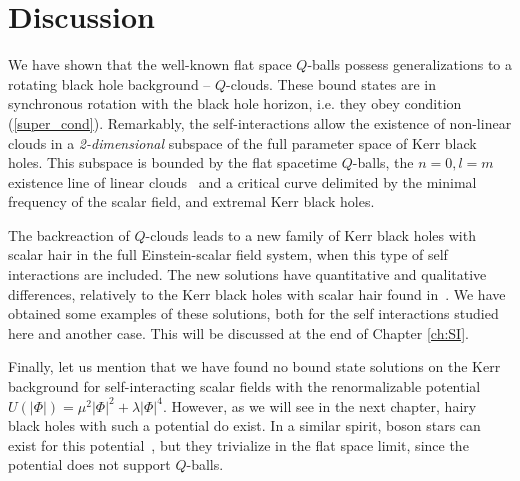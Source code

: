  
 
\section{Discussion} 

We have shown that
the well-known flat space $Q$-balls 
possess generalizations to a rotating black hole background -- $Q$-clouds. These bound states are 
in synchronous rotation with the black hole horizon, i.e. they obey condition (\ref{super_cond}).
Remarkably,
the self-interactions allow the existence of non-linear clouds 
in a \textit{2-dimensional} subspace of the full parameter space of Kerr black holes.
%
This subspace is bounded by the flat spacetime $Q$-balls,
the  $n=0,l=m$ existence line of linear clouds~\cite{Benone:2014ssa}
and a critical curve delimited by the minimal frequency of the scalar field,
and extremal Kerr black holes.
 
The backreaction of $Q$-clouds leads to a new family of Kerr black holes with scalar hair in the full Einstein-scalar field system, when this type of self interactions are included. The new solutions have quantitative and qualitative differences, relatively to the Kerr black holes with scalar hair found in~\cite{Herdeiro:2014goa}. We have obtained some examples of these solutions, both for the self interactions studied here and another case.
This will be discussed at the end of Chapter \ref{ch:SI}.

Finally, let us mention that we have found no bound state solutions on the Kerr background for self-interacting scalar fields with the renormalizable potential $U(|\Phi|) =  \mu^2 |\Phi|^2+\lambda |\Phi|^4$.
However, as we will see in the next chapter, hairy black holes with such a potential do exist.
In a similar spirit,  boson stars can exist for this potential~\cite{Colpi:1986ye,Schunck:2003kk},  but they trivialize in the flat space limit, since the potential does not support $Q$-balls. 
